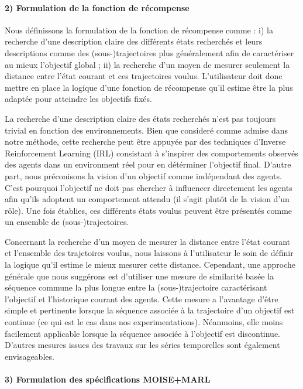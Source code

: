 \documentclass[sigconf,anonymous]{aamas}
\begin{document}
\paragraph{\textbf{2) Formulation de la fonction de récompense}} \quad

\noindent Nous définissons la formulation de la fonction de récompense comme : \quad i) la recherche d'une description claire des différents états recherchés et leurs descriptions comme des (sous-)trajectoires plus généralement afin de caractériser au mieux l'objectif global ; \quad ii) la recherche d'un moyen de mesurer seulement la distance entre l'état courant et ces trajectoires voulus. L'utilisateur doit donc mettre en place la logique d'une fonction de récompense qu'il estime être la plus adaptée pour atteindre les objectifs fixés.

La recherche d'une description claire des états recherchés n'est pas toujours trivial en fonction des environnements. Bien que consideré comme admise dans notre méthode, cette recherche peut être appuyée par des techniques d'Inverse Reinforcement Learning (IRL) consistant à s'inspirer des comportements observés des agents dans un environment réel pour en détérminer l'objectif final. D'autre part, nous préconisons la vision d'un objectif comme indépendant des agents. C'est pourquoi l'objectif ne doit pas chercher à influencer directement les agents afin qu'ils adoptent un comportement attendu (il s'agit plutôt de la vision d'un rôle). Une fois établies, ces différents états voulus peuvent être présentés comme un ensemble de (sous-)trajectoires.

Concernant la recherche d'un moyen de mesurer la distance entre l'état courant et l'ensemble des trajctoires voulus, nous laissons à l'utilisateur le soin de définir la logique qu'il estime le mieux mesurer cette distance. Cependant, une approche générale que nous suggérons est d'utiliser une mesure de similarité basée la séquence commune la plus longue entre la (sous-)trajectoire caractérisant l'objectif et l'historique courant des agents. Cette mesure a l'avantage d'être simple et pertinente lorsque la séquence associée à la trajectoire d'un objectif est continue (ce qui est le cas dans nos experimentations). Néanmoins, elle moins facilement applicable lorsque la séquence associée à l'objectif est discontinue. D'autres mesures issues des travaux sur les séries temporelles sont également envisageables.

\paragraph{\textbf{3) Formulation des spécifications MOISE+MARL}} \quad
\end{document}
